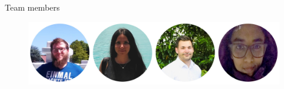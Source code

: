 \begin{frame}{Team members}

\begin{figure}[htbp]
	\centering
	\includegraphics[width=1\textwidth]{figures/FirstSemester}
\end{figure}

\end{frame}